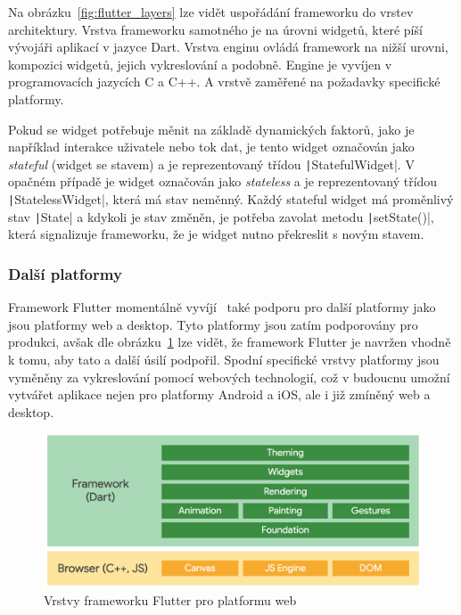 Na obrázku~\ref{fig:flutter_layers} lze vidět uspořádání frameworku do vrstev
architektury.
Vrstva frameworku samotného je na úrovni widgetů,
které píší vývojáři aplikací v jazyce Dart.
Vrstva enginu ovládá framework na nižší urovni, kompozici widgetů,
jejich vykreslování a podobně.
Engine je vyvíjen v programovacích jazycích C a C++.
A vrstvě zaměřené na požadavky specifické
platformy.~\cite{flutter_technical_overview}

Pokud se widget potřebuje měnit na základě dynamických faktorů,
jako je například interakce uživatele nebo tok dat,
je tento widget označován jako \emph{stateful} (widget se stavem) a je
reprezentovaný třídou \texttt|StatefulWidget|.
V opačném případě je widget označován jako \emph{stateless} a je 
reprezentovaný třídou \texttt|StatelessWidget|,
která má stav neměnný.
Každý stateful widget má proměnlivý stav \texttt|State|
a kdykoli je stav změněn,
je potřeba zavolat metodu \texttt|setState()|,
která signalizuje frameworku,
že je widget nutno překreslit s novým stavem.~\cite{flutter_technical_overview}

\subsubsection*{Další platformy}

Framework Flutter momentálně vyvíjí~\cite{flutter_web} také podporu pro
další platformy jako jsou platformy web a desktop.
Tyto platformy jsou zatím podporovány pro produkci,
avšak dle obrázku~\ref{fig:flutter_layers_web} lze vidět,
že framework Flutter je navržen vhodně k tomu,
aby tato a další úsilí podpořil.
Spodní specifické vrstvy platformy jsou vyměněny za vykreslování pomocí
webových technologií,
což v budoucnu umožní vytvářet aplikace nejen pro platformy Android a iOS,
ale i již zmíněný web a desktop. 

\begin{figure}[ht!]
    \centering
    \includegraphics[width=\linewidth]{assets/technology-research/framework/flutter_overview_web.png}
    \caption{Vrstvy frameworku Flutter pro platformu web
    ~\cite{flutter_web}}
    \label{fig:flutter_layers_web}
\end{figure}

